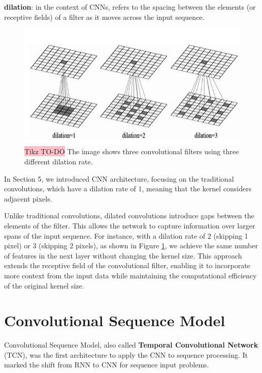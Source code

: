 \textbf{dilation}: in the context of CNNs, refers to the spacing between the elements (or receptive fields) of a filter as it moves across the input sequence. 

\begin{figure}[!htbp]
    \centering
    \includegraphics[width=\linewidth]{tikz/dilation.png}
    \caption{{\color{red}\colorbox{pink}{Tikz TO-DO}} The image shows three convolutional filters using three different dilation rate.}
    \label{fig:dilation}
\end{figure}


In Section 5, we introduced CNN architecture, focusing on the traditional convolutions, which have a dilation rate of 1, meaning that the kernel considers adjacent pixels. 

Unlike traditional convolutions, dilated convolutions introduce gaps between the elements of the filter. This allows the network to capture information over larger spans of the input sequence. For instance, with a dilation rate of 2 (skipping 1 pixel) or 3 (skipping 2 pixels), as shown in Figure \ref{fig:dilation}, we achieve the same number of features in the next layer without changing the kernel size. This approach extends the receptive field of the convolutional filter, enabling it to incorporate more context from the input data while maintaining the computational efficiency of the original kernel size.


\section{Convolutional Sequence Model}

Convolutional Sequence Model, also called \textbf{Temporal Convolutional Network} (TCN), was the first architecture to apply the CNN to sequence processing. It marked the shift from RNN to CNN for sequence input problems.




